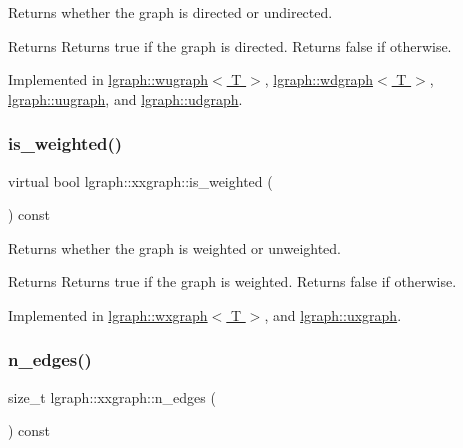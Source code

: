 Returns whether the graph is directed or undirected. 

\begin{DoxyReturn}{Returns}
Returns true if the graph is directed. Returns false if otherwise. 
\end{DoxyReturn}


Implemented in \hyperlink{classlgraph_1_1wugraph_a1614f4e23aa04055c64816c001cd093d}{lgraph\+::wugraph$<$ T $>$}, \hyperlink{classlgraph_1_1wdgraph_ab167f7c833e7db1a74e65a187f583ed4}{lgraph\+::wdgraph$<$ T $>$}, \hyperlink{classlgraph_1_1uugraph_ab8d27a5e1459960284ac0b334de91ff0}{lgraph\+::uugraph}, and \hyperlink{classlgraph_1_1udgraph_ab346eaf76d049a5148ffd87cda7eab6a}{lgraph\+::udgraph}.

\mbox{\label{classlgraph_1_1xxgraph_a0bd329c5dcbded569658b59462a08acf}} 
\subsubsection{\texorpdfstring{is\+\_\+weighted()}{is\_weighted()}}
{\footnotesize\ttfamily virtual bool lgraph\+::xxgraph\+::is\+\_\+weighted (\begin{DoxyParamCaption}{ }\end{DoxyParamCaption}) const\hspace{0.3cm}{\ttfamily [pure virtual]}}



Returns whether the graph is weighted or unweighted. 

\begin{DoxyReturn}{Returns}
Returns true if the graph is weighted. Returns false if otherwise. 
\end{DoxyReturn}


Implemented in \hyperlink{classlgraph_1_1wxgraph_a5b1bd3a7ce3c6c628ccde1cf1c2ba130}{lgraph\+::wxgraph$<$ T $>$}, and \hyperlink{classlgraph_1_1uxgraph_a8fab8e739e0e74852a1c6de18b2fe6aa}{lgraph\+::uxgraph}.

\mbox{\label{classlgraph_1_1xxgraph_af00bce8b07a42754601d1e3bebe2c1fa}} 
\subsubsection{\texorpdfstring{n\+\_\+edges()}{n\_edges()}}
{\footnotesize\ttfamily size\+\_\+t lgraph\+::xxgraph\+::n\+\_\+edges (\begin{DoxyParamCaption}{ }\end{DoxyParamCaption}) const}




